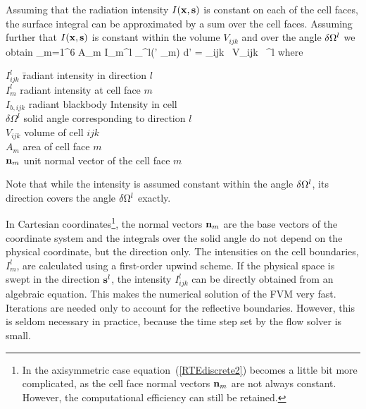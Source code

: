 \documentclass[11pt]{book}
\begin{document}
Assuming that the radiation intensity $I({\bf x},{\bf s})$ is constant on each
of the cell faces, the surface integral can be approximated by a sum
over the cell faces.  Assuming further that $I({\bf x},{\bf s})$ is constant
within the volume $V_{ijk}$ and over the angle $\delta {\Omega}^l$ we
obtain
\be  \sum_{m=1}^6 A_m \; I_m^l \;
      \int_{\Omega^l}(\bs' \cdot \bn_m) d\bs'
   = \kappa_{ijk} \,
      \; V_{ijk} \,
     \delta \Omega^l   \label{RTEdiscrete2}
\ee
where
\begin{tabbing}
$I_{ijk}^l$ \hspace{1in}  \=  radiant intensity in direction $l$ \\
$I_m^l$                   \>  radiant intensity at cell face $m$ \\
$I_{b,ijk}$               \>  radiant blackbody Intensity in cell \\
$\delta \Omega^l$         \>  solid angle corresponding to direction $l$ \\
$V_{ijk}$                 \>  volume of cell $ijk$ \\
$A_m$                     \>  area of cell face $m$ \\
${\bf n}_m$                   \>  unit normal vector of the cell face $m$
\end{tabbing}
Note that while the intensity is assumed constant within
the angle $\delta {\Omega}^l$, its direction covers the angle $\delta {\Omega}^l$
exactly.

In Cartesian coordinates\footnote{In the axisymmetric case
equation~(\ref{RTEdiscrete2}) becomes
a little bit more complicated, as the cell face normal vectors ${\bf n}_m$
are not always constant. However, the computational efficiency can still be
retained.},
the normal vectors ${\bf n}_m$ are the base
vectors of the coordinate system and the integrals over the solid
angle do not depend on the physical coordinate, but the direction
only. The intensities on the cell boundaries, $I_m^l$, are calculated
using a first-order upwind scheme.  If the physical space is swept in
the direction ${\bf s}^l$, the intensity $I_{ijk}^l$ can be directly obtained
from an algebraic equation. This makes the numerical solution of the
FVM very fast.  Iterations are needed only to account for the
reflective boundaries. However, this is seldom necessary in
practice, because the time step set by the flow solver is small.
\end{document}
